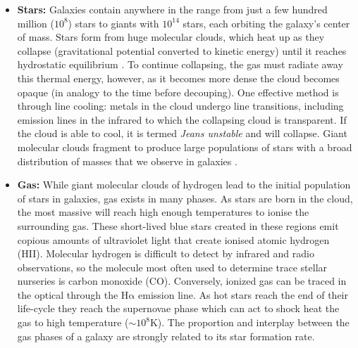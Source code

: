 \begin{itemize}
    \item \textbf{Stars:} Galaxies contain anywhere in the range from just a few hundred million ($10^8$) stars to giants with $10^{14}$ stars, each orbiting the galaxy's center of mass. Stars form from huge molecular clouds, which heat up as they collapse (gravitational potential converted to kinetic energy) until it reaches hydrostatic equilibrium \citep{jeans1902}. To continue collapsing, the gas must radiate away this thermal energy, however, as it becomes more dense the cloud becomes opaque (in analogy to the time before decouping). One effective method is through line cooling: metals in the cloud undergo line transitions, including emission lines in the infrared to which the collapsing cloud is transparent. If the cloud is able to cool, it is termed \textit{Jeans unstable} and will collapse. Giant molecular clouds fragment to produce large populations of stars with a broad distribution of masses that we observe in galaxies \citep[e.g.][]{kroupa2001}.
    
    \item \textbf{Gas:} While giant molecular clouds of hydrogen lead to the initial population of stars in galaxies, gas exists in many phases. As stars are born in the cloud, the most massive will reach high enough temperatures to ionise the surrounding gas. These short-lived blue stars created in these regions emit copious amounts of ultraviolet light that create ionised atomic hydrogen (HII). Molecular hydrogen is difficult to detect by infrared and radio observations, so the molecule most often used to determine trace stellar nurseries is carbon monoxide (CO). Conversely, ionized gas can be traced in the optical through the $\mathrm{H\alpha}$ emission line. As hot stars reach the end of their life-cycle they reach the supernovae phase which can act to shock heat the gas to high temperature ($\sim 10^{8}$K). The proportion and interplay between the gas phases of a galaxy are strongly related to its star formation rate.
    

\end{itemize}
